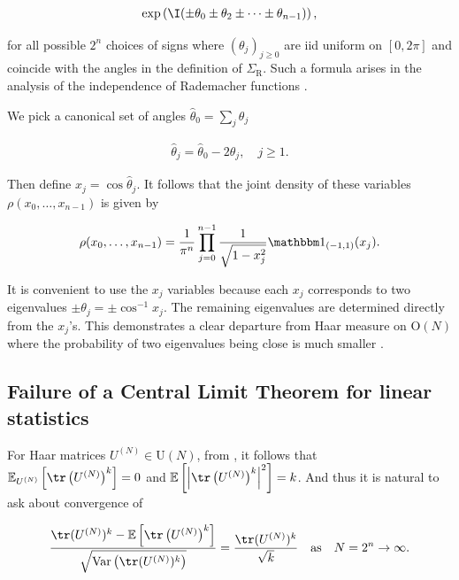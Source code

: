 \begin{align}
\exp \left( \I ( \pm \theta_0 \pm \theta_2 \pm \cdots \pm \theta_{n-1}) \right),
\end{align}

for all possible $2^n$ choices of signs where $(\theta_j)_{j \geq 0}$ are iid uniform on $[0, 2\pi]$ and coincide with the angles in the definition of $\Sigma_{\mathrm{R}}$. Such a formula arises in the analysis of the independence of Rademacher functions \cite[Chapter 1]{Kac1959}.  

We pick a canonical set of angles $\hat \theta_0 = \sum_j \theta_j$

\begin{align}
\hat \theta_j = \hat \theta_0 - 2 \theta_j, \quad j \geq 1.
\end{align}

Then define $x_j = \cos \hat \theta_j$.  It follows that the joint density of these variables $\rho(x_0,\ldots,x_{n-1})$ is given by

\begin{align}
\rho(x_0,\ldots,x_{n-1}) = \frac{1}{\pi^n} \prod_{j=0}^{n-1} \frac{1}{\sqrt{1-x_j^2}} \mathbbm 1_{(-1,1)}(x_j).
\end{align}

It is convenient to use the $x_j$ variables because each $x_j$ corresponds to two eigenvalues $\pm \theta_j = \pm \cos^{-1} x_j$.  The remaining eigenvalues are determined directly from the $x_j$'s.  This demonstrates a clear departure from Haar measure on $\mathrm O(N)$ where the probability of two eigenvalues being close is much smaller \cite{Forrester2010}.

\subsection{Failure of a Central Limit Theorem for linear statistics}

For Haar matrices $U^{(N)} \in \mathrm{U}(N)$, from \cite{Diaconis1994,Diaconis2001}, it follows that $\mathbb E_{U^{(N)}}\left[\tr \left( U^{(N)} \right)^k \right] = 0$ and $\mathbb E \left[ \left| \tr \left( U^{(N)} \right)^k \right|^2 \right] = k$.  And thus it is natural to ask about convergence of

\begin{align}
  \frac{\tr (U^{(N)})^k - \mathbb E\left[\tr \left( U^{(N)} \right)^k \right]}{\sqrt{\mathrm{Var}\left( \tr (U^{(N)})^k \right)}} = \frac{\tr (U^{(N)})^k}{\sqrt{k}}  \quad \text{as} \quad N = 2^n \to \infty.
\end{align}


